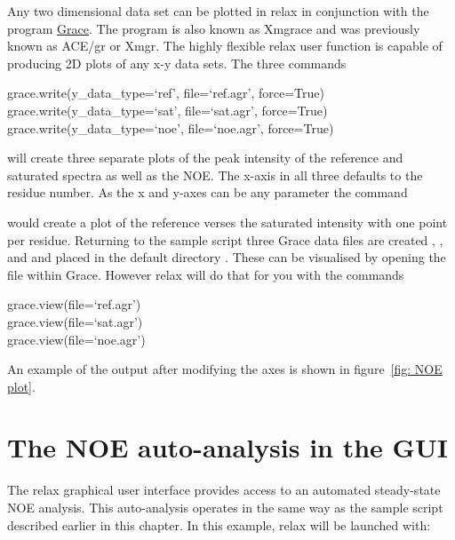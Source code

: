 Any two dimensional data set can be plotted in relax in conjunction with the program \href{http://plasma-gate.weizmann.ac.il/Grace/}{Grace}.  The program is also known as Xmgrace and was previously known as ACE/gr or Xmgr.  The highly flexible relax user function  is capable of producing 2D plots of any x-y data sets.  The three commands

\begin{exampleenv}
grace.write(y\_data\_type=`ref', file=`ref.agr', force=True) \\
grace.write(y\_data\_type=`sat', file=`sat.agr', force=True) \\
grace.write(y\_data\_type=`noe', file=`noe.agr', force=True)
\end{exampleenv}

will create three separate plots of the peak intensity of the reference and saturated spectra as well as the NOE.  The x-axis in all three defaults to the residue number.  As the x and y-axes can be any parameter the command


would create a plot of the reference verses the saturated intensity with one point per residue.  Returning to the sample script three Grace data files are created , , and  and placed in the default directory .  These can be visualised by opening the file within Grace.  However relax will do that for you with the commands

\begin{exampleenv}
grace.view(file=`ref.agr') \\
grace.view(file=`sat.agr') \\
grace.view(file=`noe.agr')
\end{exampleenv}

An example of the output after modifying the axes is shown in figure~\ref{fig: NOE plot}.



\newpage
\section{The NOE auto-analysis in the GUI}

The relax graphical user interface provides access to an automated steady-state NOE analysis.  This auto-analysis operates in the same way as the sample script described earlier in this chapter.  In this example, relax will be launched with:

